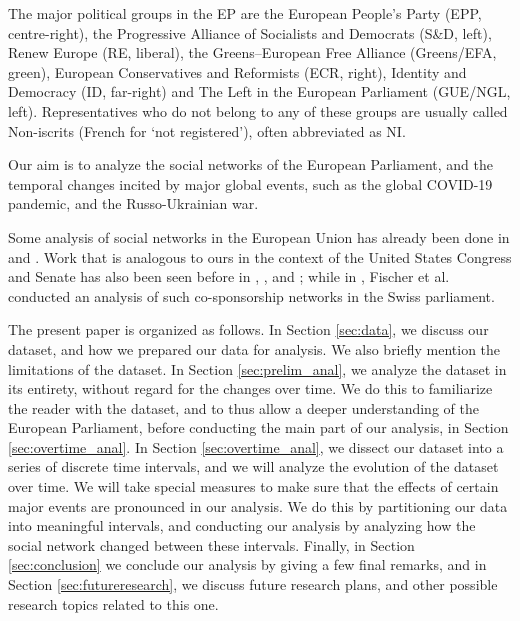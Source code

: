 \documentclass[lettersize,journal]{IEEEtran}
\begin{document}
The major political groups in the EP are the European People's Party (EPP, centre-right), the Progressive Alliance of Socialists and Democrats (S\&D, left), Renew Europe (RE, liberal), the Greens–European Free Alliance (Greens/EFA, green), European Conservatives and Reformists (ECR, right), Identity and Democracy (ID, far-right) and The Left in the European Parliament (GUE/NGL, left). Representatives who do not belong to any of these groups are usually called Non-iscrits (French for `not registered'), often abbreviated as NI.

Our aim is to analyze the social networks of the European Parliament, and the temporal changes incited by major global events, such as the global COVID-19 pandemic, and the Russo-Ukrainian war.

Some analysis of social networks in the European Union has already been done in \cite{Baller} and \cite{Cherepnalkoski}. Work that is analogous to ours in the context of the United States Congress and Senate has also been seen before in \cite{Desmarais}, \cite{Fowler}, \cite{Porter} and \cite{Tanger}; while in \cite{Fischer}, Fischer et al. conducted an analysis of such co-sponsorship networks in the Swiss parliament.


The present paper is organized as follows. In Section \ref{sec:data}, we discuss our dataset, and how we prepared our data for analysis. We also briefly mention the limitations of the dataset. In Section \ref{sec:prelim_anal}, we analyze the dataset in its entirety, without regard for the changes over time. We do this to familiarize the reader with the dataset, and to thus allow a deeper understanding of the European Parliament, before conducting the main part of our analysis, in Section \ref{sec:overtime_anal}. In Section \ref{sec:overtime_anal}, we dissect our dataset into a series of discrete time intervals, and we will analyze the evolution of the dataset over time. We will take special measures to make sure that the effects of certain major events are pronounced in our analysis. We do this by partitioning our data into meaningful intervals, and conducting our analysis by analyzing how the social network changed between these intervals. Finally, in Section \ref{sec:conclusion} we conclude our analysis by giving a few final remarks, and in Section \ref{sec:futureresearch}, we discuss future research plans, and other possible research topics related to this one.
\end{document}
